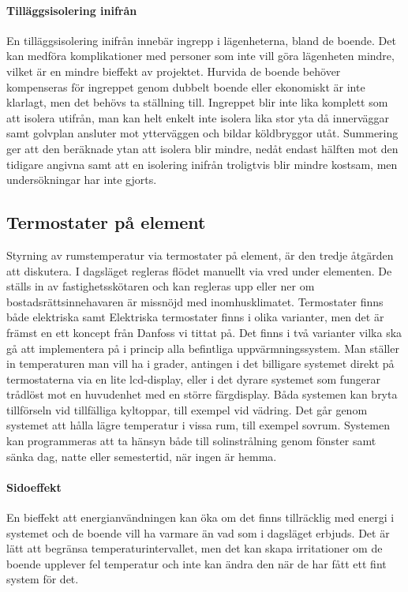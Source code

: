\paragraph{Tilläggsisolering inifrån}
En tilläggsisolering inifrån innebär ingrepp i lägenheterna, bland de boende. Det kan medföra komplikationer med personer som inte vill göra lägenheten mindre, vilket är en mindre bieffekt av projektet. Hurvida de boende behöver kompenseras för ingreppet genom dubbelt boende eller ekonomiskt är inte klarlagt, men det behövs ta ställning till. Ingreppet blir inte lika komplett som att isolera utifrån, man kan helt enkelt inte isolera lika stor yta då innerväggar samt golvplan ansluter mot ytterväggen och bildar köldbryggor utåt. Summering ger att den beräknade ytan att isolera blir mindre, nedåt endast hälften mot den tidigare angivna samt att en isolering inifrån troligtvis blir mindre kostsam, men undersökningar har inte gjorts.

\subsection{Termostater på element}
Styrning av rumstemperatur via termostater på element, är den tredje åtgärden att diskutera. I dagsläget regleras flödet manuellt via vred under elementen. De ställs in av fastighetsskötaren och kan regleras upp eller ner om bostadsrättsinnehavaren är missnöjd med inomhusklimatet. Termostater finns både elektriska samt 
Elektriska termostater finns i olika varianter, men det är främst en ett koncept från Danfoss vi tittat på. Det finns i två varianter vilka ska gå att implementera på i princip alla befintliga uppvärmningssystem. Man ställer in temperaturen man vill ha i grader, antingen i det billigare systemet direkt på termostaterna via en lite lcd-display, eller i det dyrare systemet som fungerar trådlöst mot en huvudenhet med en större färgdisplay.
Båda systemen kan bryta tillförseln vid tillfälliga kyltoppar, till exempel vid vädring. Det går genom systemet att hålla lägre temperatur i vissa rum, till exempel sovrum. Systemen kan programmeras att ta hänsyn både till solinstrålning genom fönster samt sänka dag, natte eller semestertid, när ingen är hemma.

\paragraph{Sidoeffekt}
En bieffekt att energianvändningen kan öka om det finns tillräcklig med energi i systemet och de boende vill ha varmare än vad som i dagsläget erbjuds. Det är lätt att begränsa temperaturintervallet, men det kan skapa irritationer om de boende upplever fel temperatur och inte kan ändra den när de har fått ett fint system för det.

